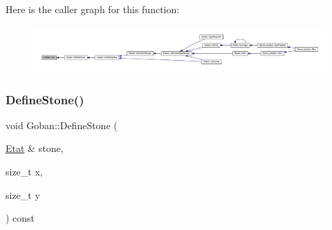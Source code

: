 Here is the caller graph for this function\+:\nopagebreak
\begin{figure}[H]
\begin{center}
\leavevmode
\includegraphics[width=350pt]{class_goban_a579840586df08a58983f6b497979344b_icgraph}
\end{center}
\end{figure}
\mbox{\label{class_goban_a0e2596110cdbb9b007b2b2fd8d5a9973}} 
\subsubsection{\texorpdfstring{Define\+Stone()}{DefineStone()}}
{\footnotesize\ttfamily void Goban\+::\+Define\+Stone (\begin{DoxyParamCaption}\item[{\hyperlink{class_etat}{Etat} \&}]{stone,  }\item[{size\+\_\+t}]{x,  }\item[{size\+\_\+t}]{y }\end{DoxyParamCaption}) const}

